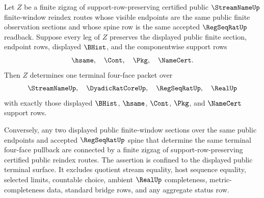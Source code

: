 \begin{theorem}
\label{thm:streamname-reindex-zigzag-normal-form}
Let $Z$ be a finite zigzag of support-row-preserving certified public
$\StreamNameUp$ finite-window reindex routes whose visible endpoints are the
same public finite observation sections and whose spine row is the same
accepted $\RegSeqRatUp$ readback. Suppose every leg of $Z$ preserves the
displayed public finite section, endpoint rows, displayed $\BHist$, and the
componentwise support rows
$$
\hsame,\quad \Cont,\quad \Pkg,\quad \NameCert.
$$
Then $Z$ determines one terminal four-face packet over
$$
\StreamNameUp,\quad \DyadicRatCoreUp,\quad \RegSeqRatUp,\quad \RealUp
$$
with exactly those displayed $\BHist$, $\hsame$, $\Cont$, $\Pkg$, and
$\NameCert$ support rows.

Conversely, any two displayed public finite-window sections over the same
public endpoints and accepted $\RegSeqRatUp$ spine that determine the same
terminal four-face pullback are connected by a finite zigzag of
support-row-preserving certified public reindex routes. The assertion is
confined to the displayed public terminal surface. It excludes quotient stream
equality, host sequence equality, selected limits, countable choice, ambient
$\RealUp$ completeness, metric-completeness data, standard bridge rows, and
any aggregate status row.
\end{theorem}
